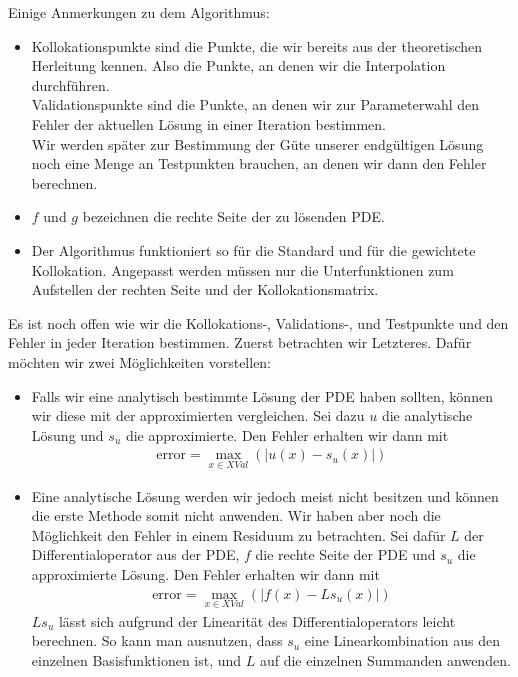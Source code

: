 Einige Anmerkungen zu dem Algorithmus:
\begin{itemize}
\item
Kollokationspunkte sind die Punkte, die wir bereits aus der theoretischen Herleitung kennen. Also die Punkte, an denen wir die Interpolation durchführen.\\
Validationspunkte sind die Punkte, an denen wir zur Parameterwahl den Fehler der aktuellen Lösung in einer Iteration bestimmen.\\
Wir werden später zur Bestimmung der Güte unserer endgültigen Lösung noch eine Menge an Testpunkten brauchen, an denen wir dann den Fehler berechnen.
\item
$f$ und $g$ bezeichnen die rechte Seite der zu lösenden \gls{PDE}.
\item
Der Algorithmus funktioniert so für die Standard und für die gewichtete Kollokation. Angepasst werden müssen nur die Unterfunktionen zum Aufstellen der rechten Seite und der Kollokationsmatrix.
\end{itemize}
Es ist noch offen wie wir die Kollokations-, Validations-, und Testpunkte und den Fehler in jeder Iteration bestimmen. Zuerst betrachten wir Letzteres. Dafür möchten wir zwei Möglichkeiten vorstellen:
\begin{itemize}
\item
Falls wir eine analytisch bestimmte Lösung der \gls{PDE} haben sollten, können wir diese mit der approximierten vergleichen. Sei dazu $u$ die analytische Lösung und $s_u$ die approximierte. Den Fehler erhalten wir dann mit
\begin{align*}
\mathrm{error} = \max_{x \in XVal} \left(\left| u(x) - s_u(x) \right| \right)
\end{align*}
\item
Eine analytische Lösung werden wir jedoch meist nicht besitzen und können die erste Methode somit nicht anwenden. Wir haben aber noch die Möglichkeit den Fehler in einem Residuum zu betrachten. Sei dafür $L$ der Differentialoperator aus der \gls{PDE}, $f$ die rechte Seite der \gls{PDE} und $s_u$ die approximierte Lösung. Den Fehler erhalten wir dann mit
\begin{align*}
\mathrm{error} = \max_{x \in XVal} \left(\left| f(x) - L s_u(x) \right| \right)
\end{align*}
$Ls_u$ lässt sich aufgrund der Linearität des Differentialoperators leicht berechnen. So kann man ausnutzen, dass $s_u$ eine Linearkombination aus den einzelnen Basisfunktionen ist, und $L$ auf die einzelnen Summanden anwenden.
\end{itemize}

